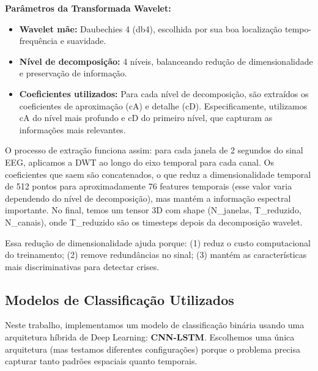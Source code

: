 \documentclass[12pt,a4paper]{article}
\begin{document}
\textbf{Parâmetros da Transformada Wavelet:}
\begin{itemize}
    \item \textbf{Wavelet mãe:} Daubechies 4 (db4), escolhida por sua boa localização tempo-frequência e suavidade.
    \item \textbf{Nível de decomposição:} 4 níveis, balanceando redução de dimensionalidade e preservação de informação.
    \item \textbf{Coeficientes utilizados:} Para cada nível de decomposição, são extraídos os coeficientes de aproximação (cA) e detalhe (cD). Especificamente, utilizamos cA do nível mais profundo e cD do primeiro nível, que capturam as informações mais relevantes.
\end{itemize}

O processo de extração funciona assim: para cada janela de 2 segundos do sinal EEG, aplicamos a DWT ao longo do eixo temporal para cada canal. Os coeficientes que saem são concatenados, o que reduz a dimensionalidade temporal de 512 pontos para aproximadamente 76 features temporais (esse valor varia dependendo do nível de decomposição), mas mantém a informação espectral importante. No final, temos um tensor 3D com shape (N\_janelas, T\_reduzido, N\_canais), onde T\_reduzido são os timesteps depois da decomposição wavelet.

Essa redução de dimensionalidade ajuda porque: (1) reduz o custo computacional do treinamento; (2) remove redundâncias no sinal; (3) mantém as características mais discriminativas para detectar crises.

\subsection{Modelos de Classificação Utilizados}

Neste trabalho, implementamos um modelo de classificação binária usando uma arquitetura híbrida de Deep Learning: \textbf{CNN-LSTM}. Escolhemos uma única arquitetura (mas testamos diferentes configurações) porque o problema precisa capturar tanto padrões espaciais quanto temporais.
\end{document}
